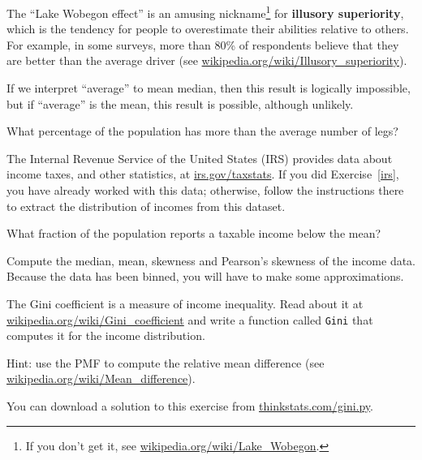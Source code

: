 \documentclass[12pt]{book}
\begin{document}
\begin{ex}

The ``Lake Wobegon effect'' is an amusing nickname\footnote{If you
  don't get it, see \url{wikipedia.org/wiki/Lake_Wobegon}.} for {\bf
  illusory superiority}, which is the tendency for people to
overestimate their abilities relative to others.  For example, in some
surveys, more than 80\% of respondents believe that they are better
than the average driver (see
  \url{wikipedia.org/wiki/Illusory_superiority}).


If we interpret ``average'' to mean median, then this result is
logically impossible, but if ``average'' is the mean, this result is
possible, although unlikely.

What percentage of the population has more than the average number
of legs?

\end{ex}


\begin{ex}


The Internal Revenue Service of the United States (IRS) provides data
about income taxes, and other statistics, at \url{irs.gov/taxstats}.
If you did Exercise~\ref{irs}, you have already worked with this data;
otherwise, follow the instructions there to extract the distribution
of incomes from this dataset.

What fraction of the population reports a taxable income below the
mean?

Compute the median, mean, skewness and Pearson's skewness of the income
data.  Because the data has been binned, you will have to make
some approximations.


The Gini coefficient is a measure of income inequality.
Read about it at \url{wikipedia.org/wiki/Gini_coefficient} and write a
function called {\tt Gini} that computes it for the income
distribution.


Hint: use the PMF to compute the relative mean difference
(see \url{wikipedia.org/wiki/Mean_difference}).


You can download a solution to this exercise from \url{thinkstats.com/gini.py}.

\end{ex}
\end{document}
